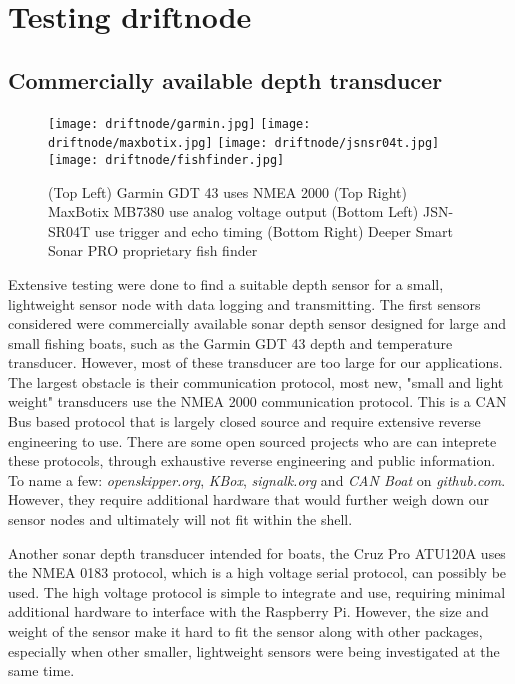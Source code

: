 \section[Depth Sensor]{Testing driftnode}

\subsection[Overview]{Commercially available depth transducer}

\begin{figure}[h]
	\begin{center}
	\texttt{[image: driftnode/garmin.jpg]}
	\texttt{[image: driftnode/maxbotix.jpg]}
	\texttt{[image: driftnode/jsnsr04t.jpg]}
	\texttt{[image: driftnode/fishfinder.jpg]}
	\caption[Various range finder]{
		(Top Left) Garmin GDT 43 uses NMEA 2000 
		(Top Right) MaxBotix MB7380 use analog voltage output 
		(Bottom Left) JSN-SR04T use trigger and echo timing
		(Bottom Right) Deeper Smart Sonar PRO proprietary fish finder 
	} \label{fig:sonarsensors}
	\end{center}
	\vspace{-1em}
\end{figure}

Extensive testing were done to find a suitable depth sensor for a small, lightweight sensor node with data logging and transmitting.
The first sensors considered were commercially available sonar depth sensor designed for large and small fishing boats, such as the Garmin GDT 43 depth and temperature transducer.
However, most of these transducer are too large for our applications.
The largest obstacle is their communication protocol, most new, "small and light weight" transducers use the NMEA 2000 communication protocol.
This is a CAN Bus based protocol that is largely closed source and require extensive reverse engineering to use.
There are some open sourced projects who are can inteprete these protocols, through exhaustive reverse engineering and public information.
To name a few: \emph{openskipper.org}, \emph{KBox}, \emph{signalk.org} and \emph{CAN Boat} on \emph{github.com}.
However, they require additional hardware that would further weigh down our sensor nodes and ultimately will not fit within the shell.

Another sonar depth transducer intended for boats, the Cruz Pro ATU120A uses the NMEA 0183 protocol, which is a high voltage serial protocol, can possibly be used.
The high voltage protocol is simple to integrate and use, requiring minimal additional hardware to interface with the Raspberry Pi.
However, the size and weight of the sensor make it hard to fit the sensor along with other packages, especially when other smaller, lightweight sensors were being investigated at the same time.

